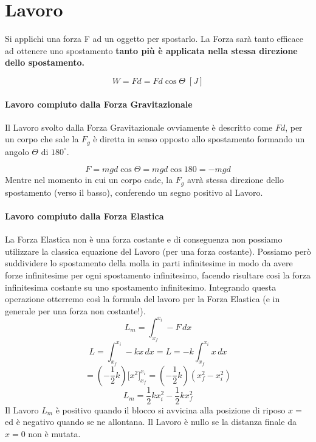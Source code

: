     \section{Lavoro} Si applichi una forza F ad un oggetto per spostarlo. La 
    Forza sarà tanto efficace ad ottenere uno spostamento \textbf{tanto più
    è applicata nella stessa direzione dello spostamento.}

        \begin{equation}
            W = Fd = Fd \cos \Theta \; [J]
        \end{equation}

        \paragraph{Lavoro compiuto dalla Forza Gravitazionale} Il Lavoro svolto 
        dalla Forza Gravitazionale ovviamente è descritto come $F d$, per un 
        corpo che sale la $F_g$ è diretta in senso opposto allo spostamento 
        formando un angolo $\Theta$ di $180^{\circ}$.
        
        \begin{equation}
            F = mgd\cos \Theta = mgd \cos 180 = - mgd
        \end{equation}
        Mentre nel momento in cui un corpo cade, la $F_g$ avrà stessa direzione
        dello spostamento (verso il basso), conferendo un segno positivo al
        Lavoro.
        
        \paragraph{Lavoro compiuto dalla Forza Elastica} La Forza Elastica non è
        una forza costante e di conseguenza non possiamo utilizzare la classica
        equazione del Lavoro (per una forza costante). Possiamo però suddividere
        lo spostamento della molla in parti infinitesime in modo da avere forze
        infinitesime per ogni spostamento infinitesimo, facendo risultare cosi 
        la forza infinitesima costante su uno spostamento infinitesimo. 
        Integrando questa operazione otterremo così la formula del lavoro per
        la Forza Elastica (e in generale per una forza non costante!).
        \begin{equation*}
            L_m = \int_{x_f}^{x_i} -F \,dx 
        \end{equation*}
        \begin{equation*}
            L = \int_{x_f}^{x_i} -kx \,dx =  L = -k \int_{x_f}^{x_i} x \,dx   
        \end{equation*}
        \begin{equation*}
            = (-\frac{1}{2}k)\bigg[x^2 \bigg]_{x_f}^{x_i}
            = (-\frac{1}{2}k) (x^2_f - x^2_i)
        \end{equation*}
        \begin{equation}
            L_m = \frac{1}{2}kx^2_i - \frac{1}{2}kx^2_f
        \end{equation}
        Il Lavoro $L_m$ è positivo quando il blocco si avvicina alla posizione 
        di riposo $x=$ ed è negativo quando se ne allontana. Il Lavoro è nullo
        se la distanza finale da $x=0$ non è mutata.

